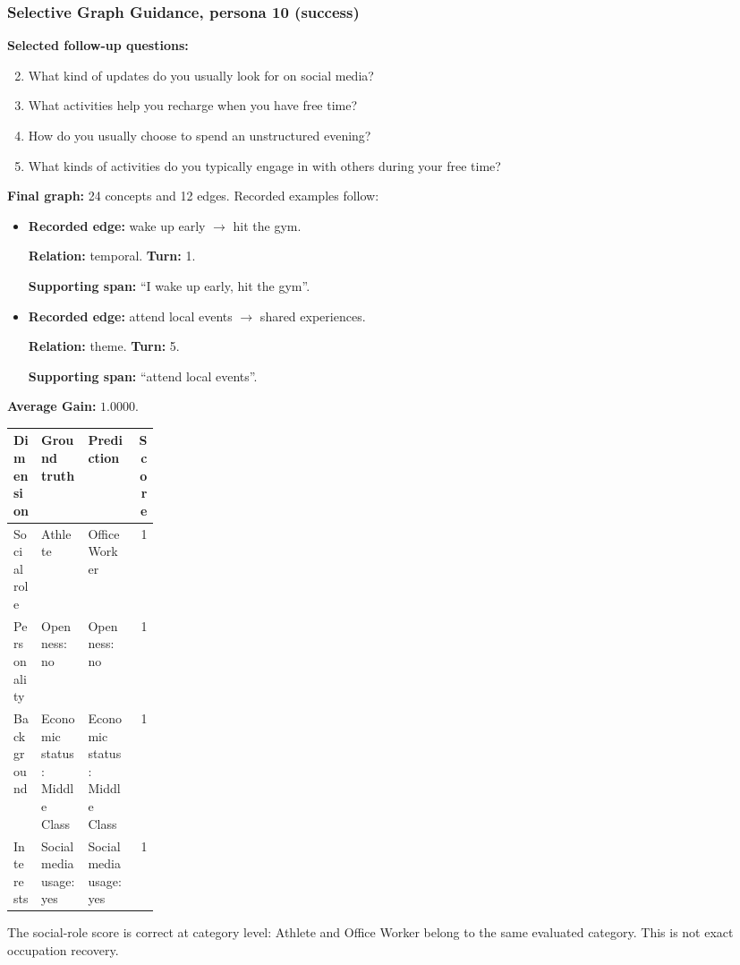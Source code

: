 \documentclass{ieeeaccess}
\begin{document}
\begin{multicols*}{2}
\subsubsection{Selective Graph Guidance, persona 10 (success)}
\noindent\textbf{Selected follow-up questions:}\par\nopagebreak[4]
\begin{enumerate}
\setcounter{enumi}{1}
\item What kind of updates do you usually look for on social media?
\item What activities help you recharge when you have free time?
\item How do you usually choose to spend an unstructured evening?
\item What kinds of activities do you typically engage in with others during your free time?
\end{enumerate}
\noindent\textbf{Final graph:} 24 concepts and 12 edges. Recorded examples follow:\par\nopagebreak[4]
\begin{itemize}
\item \textbf{Recorded edge:} wake up early $\rightarrow$ hit the gym.
\par\textbf{Relation:} temporal. \textbf{Turn:} 1.
\par\textbf{Supporting span:} ``I wake up early, hit the gym''.
\item \textbf{Recorded edge:} attend local events $\rightarrow$ shared experiences.
\par\textbf{Relation:} theme. \textbf{Turn:} 5.
\par\textbf{Supporting span:} ``attend local events''.
\end{itemize}
\noindent\begin{minipage}{\linewidth}
\noindent\textbf{Average Gain:} $1.0000$.\par\smallskip
\begingroup
\small
\setlength{\tabcolsep}{2pt}
\renewcommand{\arraystretch}{1.12}
\noindent\begin{tabularx}{\linewidth}{@{}p{0.19\linewidth}>{\raggedright\arraybackslash}X>{\raggedright\arraybackslash}Xr@{}}
\toprule
Dimension & Ground truth & Prediction & Score \\
\midrule
Social role & Athlete & Office Worker & 1 \\
\addlinespace[2pt]
Personality & Openness: no & Openness: no & 1 \\
\addlinespace[2pt]
Background & Economic status: Middle Class & Economic status: Middle Class & 1 \\
\addlinespace[2pt]
Interests & Social media usage: yes & Social media usage: yes & 1 \\
\bottomrule
\end{tabularx}\par
\endgroup
\end{minipage}\par\medskip
The social-role score is correct at category level: Athlete and Office Worker belong to the same evaluated category. This is not exact occupation recovery.

\end{multicols*}
\end{document}
